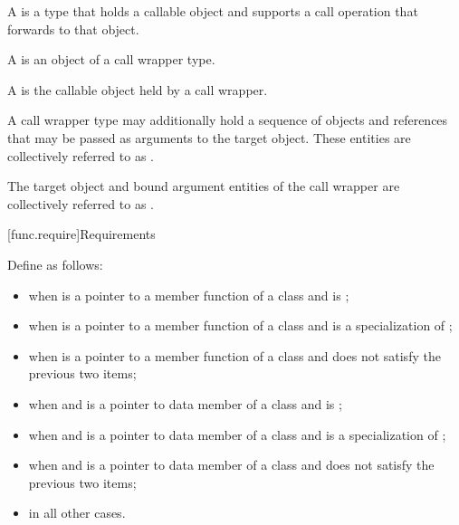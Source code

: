 \pnum
A  is a type that holds a callable object
and supports a call operation that forwards to that object.

\pnum
A  is an object of a call wrapper type.

\pnum
A  is the callable object held by a call wrapper.

\pnum
A call wrapper type may additionally hold
a sequence of objects and references
that may be passed as arguments to the target object.
These entities are collectively referred to
as .

\pnum
The target object and bound argument entities of the call wrapper are
collectively referred to as .

[func.require]{Requirements}

\pnum
{}%
Define  as follows:
\begin{itemize}
\item {} when  is a pointer to a
member function of a class 
and  is ;

\item {} when  is a pointer to a
member function of a class 
and  is a specialization of ;

\item {} when  is a pointer to a
member function of a class 
and  does not satisfy the previous two items;

\item {} when  and  is a pointer to
data member of a class 
and  is ;

\item {} when  and  is a pointer to
data member of a class 
and  is a specialization of ;

\item {} when  and  is a pointer to
data member of a class 
and  does not satisfy the previous two items;

\item {} in all other cases.
\end{itemize}


